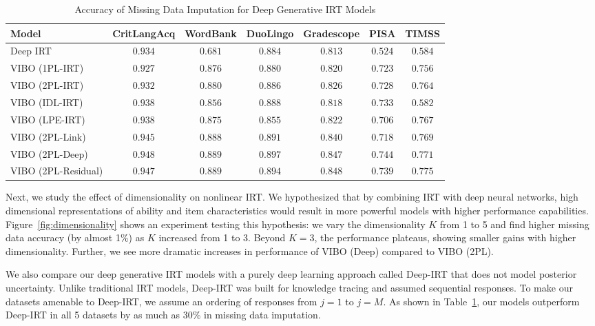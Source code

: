 \begin{table}
    \caption{Accuracy of Missing Data Imputation for Deep Generative IRT Models}
    \centering
    \scriptsize
    \begin{tabular}{lcccccc}
    \hline
    Model & CritLangAcq & WordBank & DuoLingo & Gradescope & PISA & TIMSS \\
    \hline
    Deep IRT & $0.934$ & $0.681$ & $0.884$ & $0.813$ & $0.524$ & $0.584$ \\
    VIBO (1PL-IRT) & $0.927$ & $0.876$ & $0.880$ & $0.820$ & $0.723$ & $0.756$ \\
    VIBO (2PL-IRT) & $0.932$ & $0.880$ & $0.886$ & $0.826$ & $0.728$ & $0.764$ \\
    VIBO (IDL-IRT) & $0.938$ & $0.856$ & $0.888$ & $0.818$ & $0.733$ & $0.582$ \\
    VIBO (LPE-IRT) & $0.938$ & $0.875$ & $0.855$ & $0.822$ & $0.706$ & $0.767$ \\
    VIBO (2PL-Link) & $0.945$ & $0.888$ & $0.891$ & $0.840$ & $0.718$ & $0.769$ \\
    VIBO (2PL-Deep) & $\mathbf{0.948}$ & $0.889$ & $\mathbf{0.897}$ & $0.847$ & $\mathbf{0.744}$ & $0.771$ \\
    VIBO (2PL-Residual) & $0.947$ & $\mathbf{0.889}$ & $0.894$ & $\mathbf{0.848}$ & $0.739$ & $\mathbf{0.775}$ \\
    \hline
    \end{tabular}
    \label{table:real:nonlinear:missing}
\end{table}

Next, we study the effect of dimensionality on nonlinear IRT. We hypothesized that by combining IRT with deep neural networks, high dimensional representations of ability and item characteristics would result in more powerful models with higher performance capabilities. Figure~\ref{fig:dimensionality} shows an experiment testing this hypothesis: we vary the dimensionality $K$ from 1 to 5 and find higher missing data accuracy (by almost 1\%) as $K$ increased from 1 to 3. Beyond $K=3$, the performance plateaus, showing smaller gains with higher dimensionality. Further, we see more dramatic increases in performance of VIBO (Deep) compared to VIBO (2PL).

We also compare our deep generative IRT models with a purely deep learning approach called Deep-IRT \cite{zhang2017dynamic} that does not model posterior uncertainty.
Unlike traditional IRT models, Deep-IRT was built for knowledge tracing and assumed sequential responses.
To make our datasets amenable to Deep-IRT, we assume an ordering of responses from $j=1$ to $j=M$.
As shown in Table~\ref{table:real:nonlinear:missing}, our models outperform Deep-IRT in all 5 datasets by as much as 30\% in missing data imputation.

